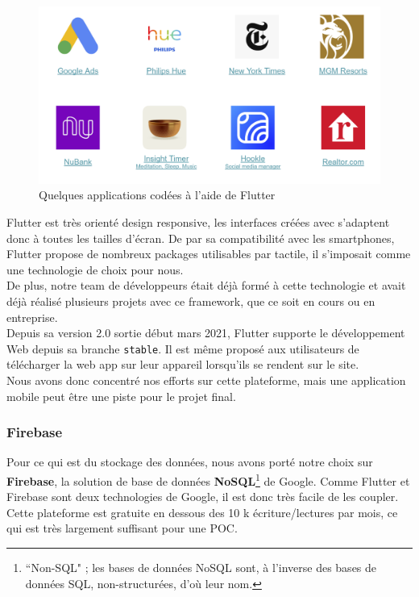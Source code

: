 \begin{figure}[!h]
    \centering
    \includegraphics[scale=0.33]{img/Apps_flutter.png}
    \caption{Quelques applications codées à l'aide de Flutter}
    \label{fig:my_label}
\end{figure}

Flutter est très orienté design responsive, les interfaces créées avec s'adaptent donc à toutes les tailles d'écran. De par sa compatibilité avec les smartphones, Flutter propose de nombreux packages utilisables par tactile, il s'imposait comme une technologie de choix pour nous.\\
De plus, notre team de développeurs était déjà formé à cette technologie et avait déjà réalisé plusieurs projets avec ce framework, que ce soit en cours ou en entreprise.\\

Depuis sa version 2.0 sortie début mars 2021, Flutter supporte le développement Web depuis sa branche \texttt{stable}. Il est même proposé aux utilisateurs de télécharger la web app sur leur appareil lorsqu'ils se rendent sur le site.\\
Nous avons donc concentré nos efforts sur cette plateforme, mais une application mobile peut être une piste pour le projet final.

\subsubsection*{Firebase}

Pour ce qui est du stockage des données, nous avons porté notre choix sur \textbf{Firebase}, la solution de base de données \textbf{NoSQL}\footnote{“Non-SQL" ; les bases de données NoSQL sont, à l'inverse des bases de données SQL, non-structurées, d'où leur nom.}\cite{NoSQL} de Google\cite{Firebase}. Comme Flutter et Firebase sont deux technologies de Google, il est donc très facile de les coupler. Cette plateforme est gratuite en dessous des 10 k écriture/lectures par mois, ce qui est très largement suffisant pour une POC.\\

